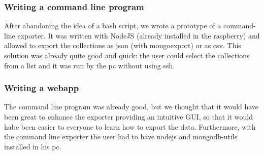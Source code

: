 \subsubsection{Writing a command line program}
After abandoning the idea of a bash script, we wrote a prototype of a command-line exporter. 
It was written with NodeJS (already installed in the raspberry) and allowed to export the collections as 
json (with mongoexport) or as csv. This solution was already quite good and quick: the user could select 
the collections from a list and it was run by the pc without using ssh.

\subsubsection{Writing a webapp}
The command line program was already good, but we thought that it would have been great to enhance the exporter 
providing an intuitive GUI, so that it would habe been easier to everyone to learn how to export the data. 
Furthermore, with the command line exporter the user had to have nodejs and mongodb-utils installed in his pc.